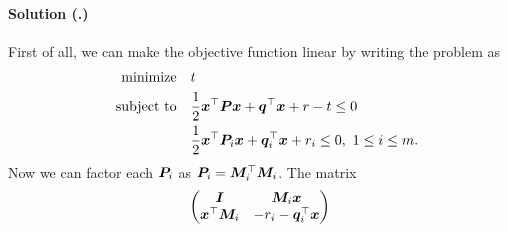 \documentclass{article}
\newcounter{problemSheetNumber}
\newcounter{problems}
\renewcommand{\solution}[1]{\paragraph{Solution (\theproblemSheetNumber.\theproblems)}\addtocounter{problems}{1}\label{#1}}
\begin{document}
\solution{pr:2} First of all, we can make the objective function linear by writing the problem as
\begin{align*}
 \text{minimize}\quad & t\\
 \quad\text{subject to}\quad & \frac{1}{2} \bm{x}^{\top}\bm{P}\bm{x}+\bm{q}^{\top}\bm{x}+r-t\leq 0\\
 & \frac{1}{2}\bm{x}^{\top}\bm{P}_i\bm{x}+\bm{q}_i^{\top}\bm{x}+r_i\leq 0, \ 1\leq i\leq m.
\end{align*}
Now we can factor each $\bm{P}_i$ as $\bm{P}_i=\bm{M}_i^{\top}\bm{M}_i$.
The matrix
\begin{equation*}
 \begin{pmatrix}
  \bm{I} & \bm{M}_i\bm{x}\\
  \bm{x}^{\top}\bm{M}_i & -r_i-\bm{q}_i^{\top}\bm{x}
 \end{pmatrix}
\end{equation*}
\end{document}
